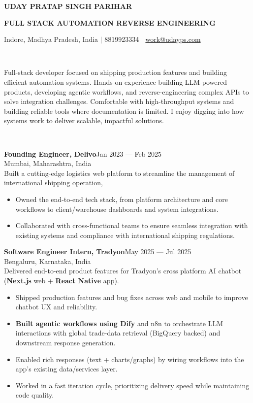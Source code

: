 \documentclass[10pt]{article}
\newcommand{\bluerule}{\noindent{\color{accent}\rule{\linewidth}{0.6pt}}}
\newcommand{\sectionhead}[1]{%
  \vspace{8pt}%
  \noindent{\color{accent}\textbf{\large\MakeUppercase{#1}}}%
  \\[-5pt]%
  \bluerule%
  \vspace{6pt}%
}
\newcommand{\entryhead}[2]{%
  \noindent\textbf{#1}\hfill #2\\%
}
\begin{document}
{\fontsize{28}{32}\selectfont\color{accent}\textbf{UDAY PRATAP SINGH PARIHAR}}

\vspace{5pt}
{\fontsize{14}{18}\selectfont\bfseries FULL STACK \textbar{} AUTOMATION \textbar{} REVERSE ENGINEERING}

\vspace{4pt}
{\small Indore, Madhya Pradesh, India $|$ 8819923334 $|$ \href{mailto:work@udayps.com}{work@udayps.com}}

\vspace{6pt}
\bluerule

\sectionhead{Profile}
Full-stack developer focused on shipping production features and building efficient automation systems. Hands-on experience building LLM-powered products, developing agentic workflows, and reverse-engineering complex APIs to solve integration challenges. Comfortable with high-throughput systems and building reliable tools where documentation is limited. I enjoy digging into how systems work to deliver scalable, impactful solutions.

\sectionhead{Work Experience}
\entryhead{Founding Engineer, Delivo}{Jan 2023 --- Feb 2025}
{\small\color{subtext}Mumbai, Maharashtra, India}\\[2pt]
Built a cutting-edge logistics web platform to streamline the management of international shipping operation,
\begin{itemize}[leftmargin=1.3em,itemsep=-2pt,topsep=2pt,parsep=0pt]
  \item Owned the end-to-end tech stack, from platform architecture and core workflows to client/warehouse dashboards and system integrations.
  \item Collaborated with cross-functional teams to ensure seamless integration with existing systems and compliance with international shipping regulations.
\end{itemize}
\vspace{5pt}
\entryhead{Software Engineer Intern, Tradyon}{May 2025 --- Jul 2025}
{\small\color{subtext}Bengaluru, Karnataka, India}\\[2pt]
Delivered end-to-end product features for Tradyon's cross platform AI chatbot (\textbf{Next.js} web + \textbf{React Native} app).
\begin{itemize}[leftmargin=1.3em,itemsep=-2pt,topsep=2pt,parsep=0pt]
  \item Shipped production features and bug fixes across web and mobile to improve chatbot UX and reliability.
  \item \textbf{Built agentic workflows using Dify} and n8n to orchestrate LLM interactions with global trade-data retrieval (BigQuery backed) and downstream response generation.
  \item Enabled rich responses (text + charts/graphs) by wiring workflows into the app's existing data/services layer.
  \item Worked in a fast iteration cycle, prioritizing delivery speed while maintaining code quality.
\end{itemize}
\end{document}
